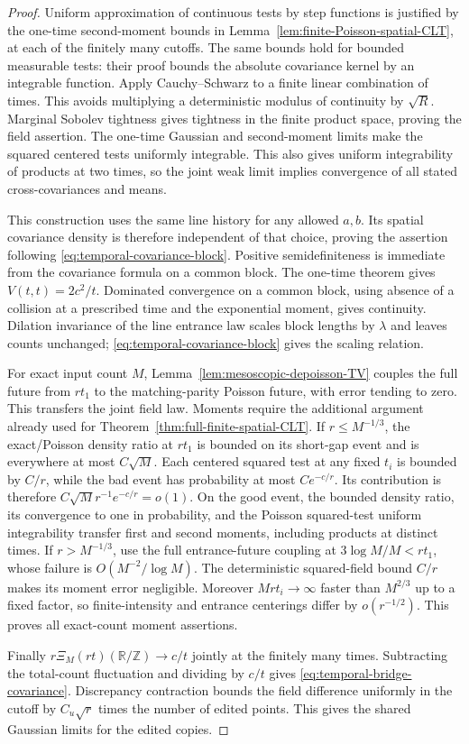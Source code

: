 \documentclass[11pt,letterpaper]{article}
\newcommand{\T}{\mathbb R/\mathbb Z}\newcommand{\Leb}{\operatorname{Leb}}
\begin{document}
\begin{proof}
Uniform approximation of continuous tests by step functions is
justified by the one-time second-moment bounds in
Lemma~\ref{lem:finite-Poisson-spatial-CLT}, at each of the finitely
many cutoffs. The same bounds hold for bounded measurable tests:
their proof bounds the absolute covariance kernel by an integrable
function. Apply Cauchy--Schwarz to a finite linear combination
of times. This avoids multiplying a deterministic modulus of
continuity by $\sqrt R$. Marginal Sobolev tightness gives tightness
in the finite product space, proving the field assertion.
The one-time Gaussian and second-moment limits make the squared
centered tests uniformly integrable. This also gives uniform
integrability of products at two times, so the joint weak limit
implies convergence of all stated cross-covariances and means.

This construction uses the same line history for any allowed
$a,b$. Its spatial covariance density is therefore independent
of that choice, proving the assertion following
\eqref{eq:temporal-covariance-block}. Positive semidefiniteness
is immediate from the covariance formula on a common block.
The one-time theorem gives $V(t,t)=2c^2/t$.
Dominated convergence on a common block, using absence of a
collision at a prescribed time and the exponential moment,
gives continuity. Dilation invariance of the line entrance law
scales block lengths by $\lambda$ and leaves counts unchanged;
\eqref{eq:temporal-covariance-block} gives the scaling relation.

For exact input count $M$, Lemma~\ref{lem:mesoscopic-depoisson-TV}
couples the full future from $r t_1$ to the matching-parity
Poisson future, with error tending to zero. This transfers the
joint field law. Moments require the additional argument already
used for Theorem~\ref{thm:full-finite-spatial-CLT}.
If $r\le M^{-1/3}$, the exact/Poisson density ratio at $rt_1$
is bounded on its short-gap event and is everywhere at most
$C\sqrt M$. Each centered squared test at any fixed $t_i$ is
bounded by $C/r$, while the bad event has probability at most
$Ce^{-c/r}$. Its contribution is therefore
$C\sqrt M r^{-1}e^{-c/r}=o(1)$. On the good event, the bounded
density ratio, its convergence to one in probability, and the
Poisson squared-test uniform integrability transfer first and
second moments, including products at distinct times.
If $r>M^{-1/3}$, use the full entrance-future coupling at
$3\log M/M<rt_1$, whose failure is $O(M^{-2}/\log M)$.
The deterministic squared-field bound $C/r$ makes its moment
error negligible. Moreover $Mr t_i\to\infty$ faster than
$M^{2/3}$ up to a fixed factor, so finite-intensity and entrance
centerings differ by $o(r^{-1/2})$. This proves all exact-count
moment assertions.

Finally $r\Xi_M(rt)(\T)\to c/t$ jointly at the finitely many
times. Subtracting the total-count fluctuation and dividing by
$c/t$ gives \eqref{eq:temporal-bridge-covariance}.
Discrepancy contraction bounds the field difference uniformly
in the cutoff by $C_u\sqrt r$ times the number of edited points.
This gives the shared Gaussian limits for the edited copies.
\end{proof}
\end{document}
